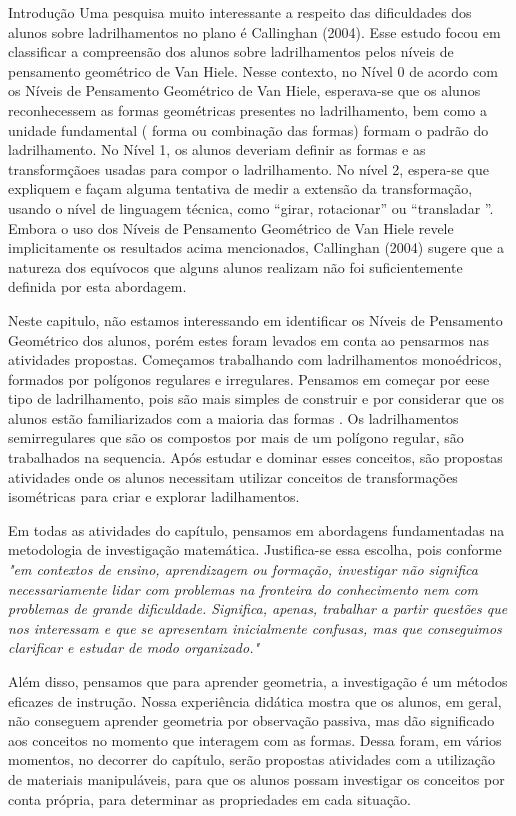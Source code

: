 \begin{apresentacao}{Introdução}
Uma pesquisa muito interessante a respeito das dificuldades dos alunos sobre ladrilhamentos no plano é Callinghan (2004). Esse estudo focou em classificar a compreensão dos alunos sobre ladrilhamentos pelos níveis de pensamento geométrico de Van Hiele. Nesse contexto, no Nível 0 de acordo com os Níveis de Pensamento Geométrico de Van Hiele, esperava-se que os alunos reconhecessem as formas geométricas presentes no ladrilhamento, bem como a unidade fundamental ( forma ou combinação das formas) formam o padrão do ladrilhamento. No Nível 1, os alunos deveriam definir as formas e as transformçãoes  usadas para compor o ladrilhamento. No nível 2, espera-se que expliquem e façam alguma tentativa de medir a extensão da transformação, usando o nível de linguagem técnica, como “girar, rotacionar” ou “transladar ”. Embora o uso dos Níveis de Pensamento Geométrico de Van Hiele revele implicitamente os resultados acima mencionados, Callinghan (2004) sugere que a natureza dos equívocos que alguns alunos realizam não foi suficientemente definida por esta abordagem. 

Neste capitulo, não estamos interessando em identificar os Níveis de Pensamento Geométrico dos alunos, porém estes foram levados em conta ao pensarmos nas atividades propostas. Começamos trabalhando com ladrilhamentos monoédricos, formados por polígonos regulares e irregulares. Pensamos em começar por eese tipo de ladrilhamento, pois são mais simples de construir e por considerar que  os alunos estão familiarizados com a maioria das  formas . Os ladrilhamentos semirregulares que são os compostos por mais de um polígono regular, são trabalhados na sequencia. Após estudar e dominar esses conceitos, são propostas atividades onde os alunos necessitam utilizar conceitos de transformações isométricas para criar e explorar ladilhamentos.

Em todas as atividades do capítulo, pensamos em abordagens fundamentadas na metodologia de investigação matemática. Justifica-se essa escolha, pois conforme \cite[p.2]{Ponte} \textit{"em contextos de ensino, aprendizagem ou formação, investigar não significa necessariamente lidar com problemas na fronteira do conhecimento nem com problemas de grande dificuldade. Significa, apenas, trabalhar a partir questões que nos interessam e que se apresentam inicialmente confusas, mas que conseguimos clarificar e estudar de modo organizado." }

Além disso, pensamos que para aprender geometria, a investigação é um métodos eficazes de instrução. Nossa experiência didática mostra que os alunos, em geral, não conseguem aprender geometria por observação passiva, mas dão significado aos conceitos no momento que interagem com as formas. Dessa foram, em vários momentos, no decorrer do capítulo, serão propostas atividades com a utilização de materiais manipuláveis, para que os alunos possam investigar os conceitos por conta própria,  para determinar as propriedades em cada situação. 



\end{apresentacao}
